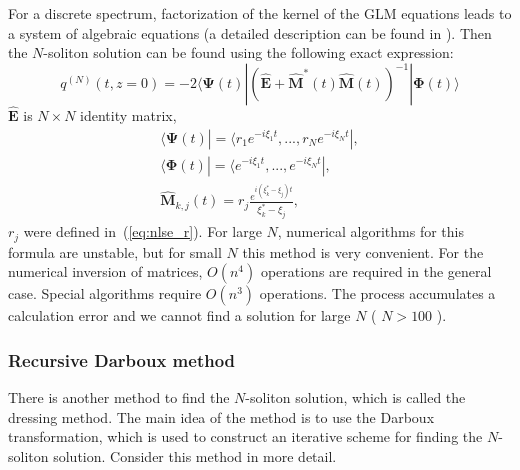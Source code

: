 For a discrete spectrum, factorization of the kernel of the GLM equations leads to a system of algebraic equations (a detailed description can be found in \cite{lamb1980}). Then the $ N $-soliton solution can be found using the following exact expression:
\begin{equation}
    q^{(N)}(t, z = 0) = -2 \langle \mathbf{\Psi}(t) | (\widehat{\mathbf{E}} + 
    \widehat{\mathbf{M}}^*(t) \widehat{\mathbf{M}}(t) )^{-1} | \mathbf{\Phi}(t) \rangle
\end{equation}
$\widehat{\mathbf{E}}$ is $N \times N$ identity matrix,
\begin{eqnarray}
    \langle \mathbf{\Psi}(t) | = \langle r_1 e^{-i \xi_1 t}, ... , r_N e^{-i \xi_N t} | {,} \nonumber \\
    \langle \mathbf{\Phi}(t) | = \langle e^{-i \xi_1 t}, ... , e^{-i \xi_N t} | {,} \nonumber \\
    \widehat{\mathbf{M}}_{k,j}(t) = r_j \frac{e^{i (\xi_k^{*} - \xi_j) t}}{\xi_k^{*} - \xi_j} {,}
\end{eqnarray}
$r_j$ were defined in~(\ref{eq:nlse_r}).
For large $ N $, numerical algorithms for this formula are unstable, but for small $ N $ this method is very convenient. For the numerical inversion of matrices, $O(n^4)$ operations are required in the general case. Special algorithms require $O(n^3)$ operations. The process accumulates a calculation error and we cannot find a solution for large $N$ ( $N > 100$ ).

\subsubsection{Recursive Darboux method}

There is another method to find the $N$-soliton solution, which is called the dressing method. The main idea of the method is to use the Darboux transformation, which is used to construct an iterative scheme for finding the $ N $-soliton solution. Consider this method in more detail.

